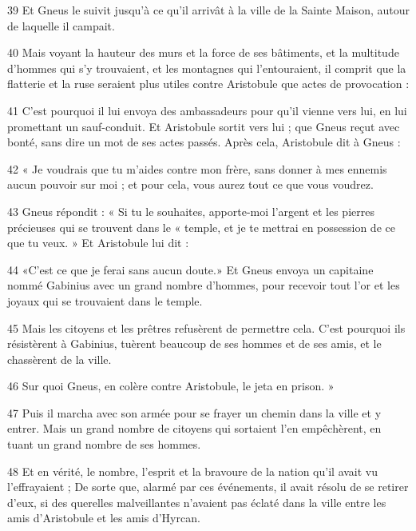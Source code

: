 \par 39 Et Gneus le suivit jusqu'à ce qu'il arrivât à la ville de la Sainte Maison, autour de laquelle il campait.

\par 40 Mais voyant la hauteur des murs et la force de ses bâtiments, et la multitude d'hommes qui s'y trouvaient, et les montagnes qui l'entouraient, il comprit que la flatterie et la ruse seraient plus utiles contre Aristobule que actes de provocation :

\par 41 C'est pourquoi il lui envoya des ambassadeurs pour qu'il vienne vers lui, en lui promettant un sauf-conduit. Et Aristobule sortit vers lui ; que Gneus reçut avec bonté, sans dire un mot de ses actes passés. Après cela, Aristobule dit à Gneus :

\par 42 « Je voudrais que tu m'aides contre mon frère, sans donner à mes ennemis aucun pouvoir sur moi ; et pour cela, vous aurez tout ce que vous voudrez.

\par 43 Gneus répondit : « Si tu le souhaites, apporte-moi l'argent et les pierres précieuses qui se trouvent dans le « temple, et je te mettrai en possession de ce que tu veux. » Et Aristobule lui dit :

\par 44 «C'est ce que je ferai sans aucun doute.» Et Gneus envoya un capitaine nommé Gabinius avec un grand nombre d'hommes, pour recevoir tout l'or et les joyaux qui se trouvaient dans le temple.

\par 45 Mais les citoyens et les prêtres refusèrent de permettre cela. C'est pourquoi ils résistèrent à Gabinius, tuèrent beaucoup de ses hommes et de ses amis, et le chassèrent de la ville.

\par 46 Sur quoi Gneus, en colère contre Aristobule, le jeta en prison. »

\par 47 Puis il marcha avec son armée pour se frayer un chemin dans la ville et y entrer. Mais un grand nombre de citoyens qui sortaient l'en empêchèrent, en tuant un grand nombre de ses hommes.

\par 48 Et en vérité, le nombre, l'esprit et la bravoure de la nation qu'il avait vu l'effrayaient ; De sorte que, alarmé par ces événements, il avait résolu de se retirer d'eux, si des querelles malveillantes n'avaient pas éclaté dans la ville entre les amis d'Aristobule et les amis d'Hyrcan.

